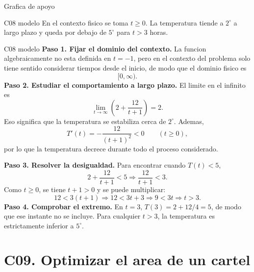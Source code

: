 \begin{databox}{Grafica de apoyo}
\begin{center}
\end{center}
\end{databox}

\begin{shortanswer}{C08 modelo}
En el contexto fisico se toma \(t\geq 0\). La temperatura tiende a \(2^\circ\) a largo plazo y
queda por debajo de \(5^\circ\) para \(t>3\) horas.
\end{shortanswer}

\begin{fullsolution}{C08 modelo}
\textbf{Paso 1. Fijar el dominio del contexto.}
La funcion algebraicamente no esta definida en \(t=-1\), pero en el contexto del problema solo
tiene sentido considerar tiempos desde el inicio, de modo que el dominio fisico es
\[
[0,\infty).
\]
\textbf{Paso 2. Estudiar el comportamiento a largo plazo.}
El limite en el infinito es
\[
\lim_{t\to\infty}\left(2+\frac{12}{t+1}\right)=2.
\]
Eso significa que la temperatura se estabiliza cerca de \(2^\circ\).
Ademas,
\[
T'(t)=-\frac{12}{(t+1)^2}<0\qquad (t\geq0),
\]
por lo que la temperatura decrece durante todo el proceso considerado.

\textbf{Paso 3. Resolver la desigualdad.}
Para encontrar cuando \(T(t)<5\),
\[
2+\frac{12}{t+1}<5
\Longrightarrow
\frac{12}{t+1}<3.
\]
Como \(t\geq 0\), se tiene \(t+1>0\) y se puede multiplicar:
\[
12<3(t+1)
\Longrightarrow
12<3t+3
\Longrightarrow
9<3t
\Longrightarrow
t>3.
\]
\textbf{Paso 4. Comprobar el extremo.} En \(t=3\), \(T(3)=2+12/4=5\), de modo que ese instante
no se incluye. Para cualquier \(t>3\), la temperatura es estrictamente inferior a \(5^\circ\).
\end{fullsolution}

\section{C09. Optimizar el area de un cartel}

